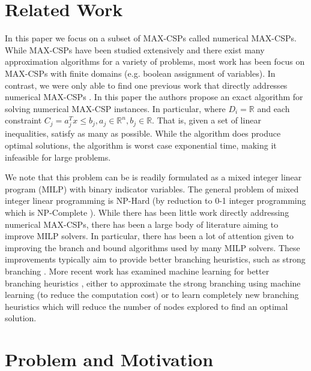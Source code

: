 \documentclass[a4paper]{article}
\begin{document}
\section{Related Work}

In this paper we focus on a subset of MAX-CSPs called numerical MAX-CSPs.  While
MAX-CSPs have been studied extensively and there exist many approximation
algorithms \cite{approx_for_csp_paper} for a variety of problems, most work has
been focus on MAX-CSPs with finite domains (e.g. boolean assignment of
variables).  In contrast, we were only 
able to find one previous work that directly addresses numerical MAX-CSPs
\cite{num_max_csp_paper}.  In this paper the authors propose an exact algorithm
for solving numerical MAX-CSP instances. In particular, where $D_i =
\mathds{R}$ and each constraint $C_j = a_j^Tx \leq b_j, a_j \in \mathds{R}^n,
b_j \in \mathds{R}$.  That is, given a set of linear inequalities, satisfy as
many as possible. While the algorithm does
produce optimal solutions, the algorithm is worst case exponential time, making
it infeasible for large problems. 

We note that this problem can be is readily formulated as a mixed integer
linear program (MILP) with binary indicator variables. The general problem of
mixed integer linear programming is NP-Hard (by reduction to 0-1
integer programming which is NP-Complete \cite{karp_1972}). While there has
been little work directly addressing numerical MAX-CSPs, there has been a
large body of literature aiming to improve MILP solvers. In particular, there
has been a lot of attention given to improving the branch and bound algorithms
used by many MILP solvers. These improvements typically aim to provide better
branching heuristics, such as strong branching
\cite{strong_branching_paper}. More recent work has examined machine learning
for better branching heuristics \cite{bengio_lodi_prouvost_2021}
\cite{liberto_kadioglu_leo_malitsky_2016}, either to approximate the strong
branching using machine learning (to reduce the computation cost) or to learn
 completely new branching heuristics which will reduce the number of nodes 
 explored to find an optimal solution.

\section{Problem and Motivation}
\end{document}
